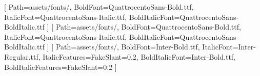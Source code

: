 \usepackage[letterpaper,left=0.75in,right=0.75in,top=1.42in,bottom=1.18in,headheight=18pt,headsep=16pt,footskip=0.57in]{geometry}
\usepackage{fontspec}
\setmainfont{QuattrocentoSans-Regular.ttf}[
  Path=assets/fonts/,
  BoldFont=QuattrocentoSans-Bold.ttf,
  ItalicFont=QuattrocentoSans-Italic.ttf,
  BoldItalicFont=QuattrocentoSans-BoldItalic.ttf
]
\setsansfont{QuattrocentoSans-Regular.ttf}[
  Path=assets/fonts/,
  BoldFont=QuattrocentoSans-Bold.ttf,
  ItalicFont=QuattrocentoSans-Italic.ttf,
  BoldItalicFont=QuattrocentoSans-BoldItalic.ttf
]
\newfontfamily{}[
  Path=assets/fonts/,
  BoldFont=Inter-Bold.ttf,
  ItalicFont=Inter-Regular.ttf,
  ItalicFeatures={FakeSlant=0.2},
  BoldItalicFont=Inter-Bold.ttf,
  BoldItalicFeatures={FakeSlant=0.2}
]
\usepackage[protrusion=false]{microtype}
\usepackage{graphicx}
\usepackage{tikz}
\usetikzlibrary{calc}
\usepackage{xcolor}
\newcommand{\tableheader}[1]{\textcolor{white}{\textbf{#1}}}
\usepackage{array,longtable,booktabs,calc,colortbl}
\ExplSyntaxOn
\makeatletter
\def\LT@output{%
  \ifnum\outputpenalty <-\@Mi
    \ifnum\outputpenalty > -\LT@end@pen
      \LT@err{floats~ and~ marginpars~ not~ allowed~ in~ a~ longtable}\@ehc
    \else
      \setbox\z@\vbox{\unvbox\@cclv}%
      \ifdim \ht\LT@lastfoot>\ht\LT@foot
        \dimen@\pagegoal
        \advance\dimen@\ht\LT@foot
        \advance\dimen@-\ht\LT@lastfoot
        \ifdim\dimen@<\ht\z@
          \setbox\@cclv\vbox{\unvbox\z@\copy\LT@foot
            \vskip 0pt plus \maxdimen minus \normalbaselineskip}%
          \@makecol
          \@expl@@@mark@update@singlecol@structures@@
          \@outputpage
          \global\vsize\@colroom
          \setbox\z@\vbox{\box\LT@head}%
        \fi
      \fi
      \unvbox\z@\box\ifvoid\LT@lastfoot\LT@foot\else\LT@lastfoot\fi
      \UseTaggingSocket{tbl/longtable/foot}%
    \fi
  \else
    \setbox\@cclv\vbox{\unvbox\@cclv\copy\LT@foot
      \vskip 0pt plus \maxdimen minus \normalbaselineskip}%
    \UseTaggingSocket{tbl/longtable/foot}%
    \@makecol
    \@expl@@@mark@update@singlecol@structures@@
    \@outputpage
    \global\vsize\@colroom
    \copy\LT@head\nobreak
  \fi}
\makeatother
\ExplSyntaxOff
\usepackage{etoolbox}
\usepackage{enumitem}
\usepackage{titlesec}
